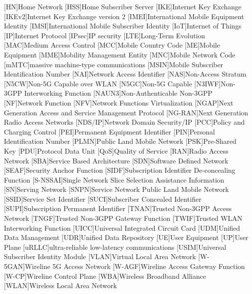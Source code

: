 \begin{multicols}{2}
\begin{acronym}[AAAAAA]
[HN]{Home Network}
[HSS]{Home Subscriber Server}
[IKE]{Internet Key Exchange}
[IKEv2]{Internet Key Exchange version 2}
[IMEI]{International Mobile Equipment Identity}
[IMSI]{International Mobile Subscriber Identity}
[IoT]{Internet of Things}
[IP]{Internet Protocol}
[IPsec]{IP security}
[LTE]{Long-Term Evolution}
[MAC]{Medium Access Control}
[MCC]{Mobile Country Code}
[ME]{Mobile Equipment}
[MME]{Mobility Management Entity}
[MNC]{Mobile Network Code}
[mMTC]{massive machine-type communications}
[MSIN]{Mobile Subscriber Identification Number}
[NAI]{Network Access Identifier}
[NAS]{Non-Access Stratum}
[N5CW]{Non-5G Capable over WLAN}
[N5GC]{Non-5G Capable}
[N3IWF]{Non-3GPP Interworking Function}
[NAUN3]{Non-Authenticable Non-3GPP}
[NF]{Network Function}
[NFV]{Network Functions Virtualization}
[NGAP]{Next Generation Access and Service Management Protocol}
[NG-RAN]{Next Generation Radio Access Networks}
[NDS/IP]{Network Domain Security/IP}
[PCC]{Policy and Charging Control}
[PEI]{Permanent Equipment Identifier}
[PIN]{Personal Identification Number}
[PLMN]{Public Land Mobile Network}
[PSK]{Pre-Shared Key}
[PDU]{Protocol Data Unit}
[QoS]{Quality of Service}
[RAN]{Radio Access Network}
[SBA]{Service Based Architecture}
[SDN]{Software Defined Network}
[SEAF]{Security Anchor Function}
[SIDF]{Subscription Identifier De-concealing Function}
[S-NSSAI]{Single Network Slice Selection Assistance Information}
[SN]{Serving Network}
[SNPN]{Service Network Public Land Mobile Network}
[SSID]{Service Set Identifier}
[SUCI]{Subscriber Concealed Identifier}
[SUPI]{Subscription Permanent Identifier}
[TNAN]{Trusted Non-3GPP Access Network}
[TNGF]{Trusted Non-3GPP Gateway Function}
[TWIF]{Trusted WLAN Interworking Function}
[UICC]{Universal Integrated Circuit Card}
[UDM]{Unified Data Management}
[UDR]{Unified Data Repository}
[UE]{User Equipment}
[UP]{User Plane}
[uRLLC]{ultra-reliable low-latency communications}
[USIM]{Universal Subscriber Identity Module}
[VLAN]{Virtual Local Area Network}
[W-5GAN]{Wireline 5G Access Network}
[W-AGF]{Wireline Access Gateway Function}
[W-CP]{Wireline Control Plane}
[WBA]{Wireless Broadband Alliance}
[WLAN]{Wireless Local Area Network}
\end{acronym}
\end{multicols}